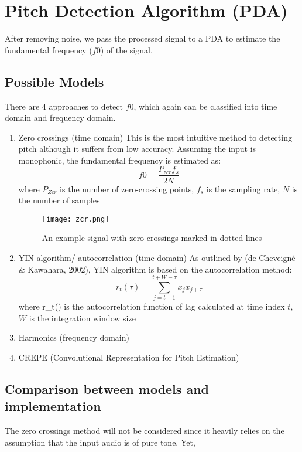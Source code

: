 \section{Pitch Detection Algorithm (PDA)}
After removing noise, we pass the processed signal to a PDA to estimate the fundamental frequency ($f0$) of
the signal.

\subsection{Possible Models}
There are 4 approaches to detect $f0$, which again can be classified into time domain and frequency domain.

\begin{enumerate}
	\item Zero crossings (time domain)
	This is the most intuitive method to detecting pitch although it suffers from low accuracy.
	Assuming the input is monophonic, the fundamental frequency is estimated as:
	\[f0 = \frac{P_{zcr}f_s}{2N}\]
	where $P_{Zcr}$ is the number of zero-crossing points, $f_s$ is the sampling rate,
	$N$ is the number of samples
	\begin{figure}
		\texttt{[image: zcr.png]}
		\caption{An example signal with zero-crossings marked in dotted lines \cite{zcr}}
	\end{figure}
	\item YIN algorithm/ autocorrelation (time domain)
	As outlined by (de Cheveigné & Kawahara, 2002), YIN algorithm is based on the autocorrelation method:
	\[r_t(\tau)=\sum_{j=t+1}^{t+W-\tau}x_j x_{j+\tau}\]
	where r_t(\tau) is the autocorrelation function of lag \tau calculated at time index $t$, $W$ is the integration
	window size






	\item Harmonics (frequency domain)
	\item CREPE (Convolutional Representation for Pitch Estimation)
\end{enumerate}

\subsection{Comparison between models and implementation}
The zero crossings method will not be considered since it heavily relies on the assumption that the input audio is of pure tone. Yet,


